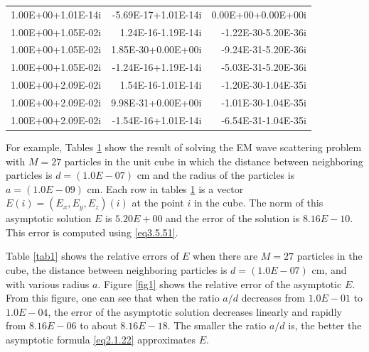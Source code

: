 \documentclass[12pt]{article}
\numberwithin{equation}{section}
\begin{document}
\begin{table}[htbp]
\begin{tabular}{rrr}
		    1.00E+00+1.01E-14i &  -5.69E-17+1.01E-14i &  0.00E+00+0.00E+00i \\
		    1.00E+00+1.05E-02i &  1.24E-16-1.19E-14i &  -1.22E-30-5.20E-36i \\
		    1.00E+00+1.05E-02i &  1.85E-30+0.00E+00i &  -9.24E-31-5.20E-36i \\
		    1.00E+00+1.05E-02i &  -1.24E-16+1.19E-14i &  -5.03E-31-5.20E-36i \\
		    1.00E+00+2.09E-02i &  1.54E-16-1.01E-14i &  -1.20E-30-1.04E-35i \\
		    1.00E+00+2.09E-02i &  9.98E-31+0.00E+00i &  -1.01E-30-1.04E-35i \\
		    1.00E+00+2.09E-02i &  -1.54E-16+1.01E-14i &  -6.54E-31-1.04E-35i \\
        \bottomrule
    \end{tabular}%
  \label{tab1.0}%
\end{table}%

For example, Tables \ref{tab1.0} show the result of solving the EM wave scattering problem with $M=27$ particles in the unit cube in which the distance between neighboring particles is $d=(1.0E-07)$ cm and the radius of the particles is $a=(1.0E-09)$ cm. Each row in tables \ref{tab1.0} is a vector $E(i)=(E_x,E_y,E_z)(i)$ at the point $i$ in the cube. The norm of this asymptotic solution $E$ is $5.20E+00$ and the error of the solution is $8.16E-10$. This error is computed using \eqref{eq3.5.51}.

Table \ref{tab1} shows the relative errors of $E$ when there are $M=27$ particles in the cube, the distance between neighboring particles is $d=(1.0E-07)$ cm, and with various radius $a$. Figure \ref{fig1} shows the relative error of the asymptotic $E$. From this figure, one can see that when the ratio $a/d$ decreases from $1.0E-01$ to $1.0E-04$, the error of the asymptotic solution decreases linearly and rapidly from $8.16E-06$ to about $8.16E-18$. The smaller the ratio $a/d$ is, the better the asymptotic formula \eqref{eq2.1.22} approximates $E$.
\end{document}
